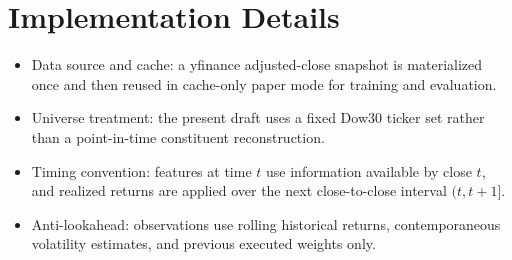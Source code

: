\documentclass[10pt,twocolumn]{article}
\begin{document}
\section{Implementation Details}
\label{app:implementation_details}
\begin{itemize}[leftmargin=*,itemsep=1pt]
\item Data source and cache: a yfinance adjusted-close snapshot is materialized once and then reused in cache-only paper mode for training and evaluation.
\item Universe treatment: the present draft uses a fixed Dow30 ticker set rather than a point-in-time constituent reconstruction.
\item Timing convention: features at time $t$ use information available by close $t$, and realized returns are applied over the next close-to-close interval $(t,t+1]$.
\item Anti-lookahead: observations use rolling historical returns, contemporaneous volatility estimates, and previous executed weights only.
\end{itemize}
\end{document}
